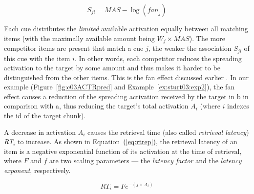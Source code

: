\documentclass{cambridge7A}\usepackage[]{graphicx}\usepackage[]{color}
\begin{document}
\begin{equation}
  S_{ji} = \textit{MAS} - \log(\textit{fan}_{j}) \label{eq:assoc}%
\end{equation}

Each cue distributes the \emph{limited} available activation equally between all matching items (with the maximally available amount being $W_j\times\textit{MAS}$).
The more competitor items are present that match a cue $j$, the weaker the association $S_{ji}$ of this cue with the item $i$. In other words, each competitor reduces the spreading activation to the target by some amount and thus makes it harder to be distinguished from the other items.
This is the  fan effect discussed earlier  \citep{anderson1974retrieval}.  In our example (Figure~\ref{fig:c03ACTRpred} and Example~\ref{ex:sturt03:exp2}), the fan effect causes a reduction of the spreading activation received by the target in b in comparison with a, thus reducing the target's total activation $A_i$ (where $i$ indexes the id of the target chunk). 

A decrease in activation $A_i$ causes the retrieval time (also called  \emph{retrieval latency}) \textit{RT}$_i$ to increase. As shown in Equation~(\ref{eq:rtrep}), the retrieval latency of an item is a negative exponential function of its activation at the time of retrieval, where $F$ and $f$ are two scaling parameters --- the  \emph{latency factor} and the  \emph{latency exponent}, respectively.

\begin{equation}
  \textit{RT}_i = Fe^{-(f\times A_i)} \label{eq:rtrep}
\end{equation}
\end{document}
